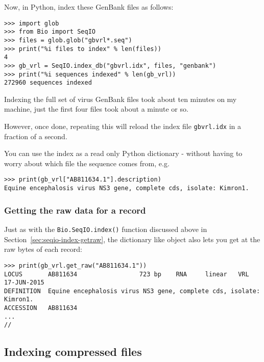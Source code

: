 Now, in Python, index these GenBank files as follows:

\begin{verbatim}
>>> import glob
>>> from Bio import SeqIO
>>> files = glob.glob("gbvrl*.seq")
>>> print("%i files to index" % len(files))
4
>>> gb_vrl = SeqIO.index_db("gbvrl.idx", files, "genbank")
>>> print("%i sequences indexed" % len(gb_vrl))
272960 sequences indexed
\end{verbatim}

Indexing the full set of virus GenBank files took about ten minutes on my machine,
just the first four files took about a minute or so.

However, once done, repeating this will reload the index file \verb|gbvrl.idx|
in a fraction of a second.

You can use the index as a read only Python dictionary - without having to worry
about which file the sequence comes from, e.g.

\begin{verbatim}
>>> print(gb_vrl["AB811634.1"].description)
Equine encephalosis virus NS3 gene, complete cds, isolate: Kimron1.
\end{verbatim}

\subsubsection{Getting the raw data for a record}

Just as with the \verb|Bio.SeqIO.index()| function discussed above in
Section~\ref{sec:seqio-index-getraw}, the dictionary like object also lets you
get at the raw bytes of each record:

%
\begin{verbatim}
>>> print(gb_vrl.get_raw("AB811634.1"))
LOCUS       AB811634                 723 bp    RNA     linear   VRL 17-JUN-2015
DEFINITION  Equine encephalosis virus NS3 gene, complete cds, isolate: Kimron1.
ACCESSION   AB811634
...
//
\end{verbatim}

\subsection{Indexing compressed files}
\label{sec:SeqIO-index-bgzf}

